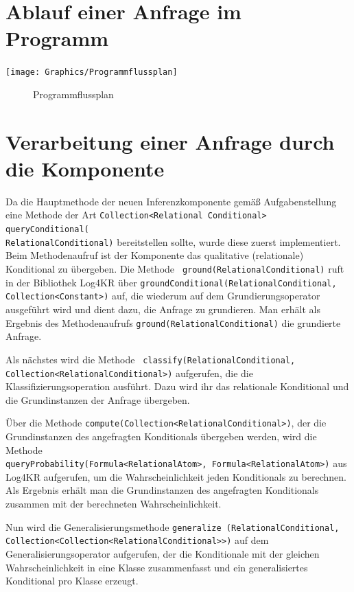 \documentclass[a4paper, 11pt]{book}
\begin{document}
{\section{Ablauf einer Anfrage im Programm}

\texttt{[image: Graphics/Programmflussplan]}
\begin{figure}[h]
		\caption{Programmflussplan}
\end{figure}


\section{Verarbeitung einer Anfrage durch die Komponente}
Da die Hauptmethode der neuen Inferenzkomponente gemäß Aufgabenstellung eine Methode der Art \texttt{Collection<Relational Conditional> queryConditional(\\RelationalConditional)} bereitstellen sollte, wurde diese zuerst  implementiert. Beim Methodenaufruf ist der Komponente das qualitative (relationale) Konditional zu übergeben.
Die Methode \texttt{ ground(RelationalConditional)} ruft in der Bibliothek Log4KR über \texttt{groundConditional(RelationalConditional, Collection<Constant>)} auf, die wiederum auf dem Grundierungsoperator ausgeführt wird und dient dazu, die Anfrage zu grundieren. Man erhält als Ergebnis des Methodenaufrufs \texttt{ground(RelationalConditional)} die grundierte Anfrage.

Als nächstes wird die Methode \texttt{ classify(RelationalConditional,\\ Collection<RelationalConditional>)} aufgerufen, die die Klassifizierungsoperation ausführt.
Dazu wird ihr das relationale Konditional und die Grundinstanzen der Anfrage übergeben.

Über die Methode \texttt{compute(Collection<RelationalConditional>)}, der die Grundinstanzen des angefragten Konditionals übergeben werden, wird die Methode\\ \texttt{queryProbability(Formula<RelationalAtom>, Formula<RelationalAtom>)} aus Log4KR aufgerufen, um die Wahrscheinlichkeit jeden Konditionals zu berechnen. Als Ergebnis erhält man die Grundinstanzen des angefragten Konditionals zusammen mit der berechneten Wahrscheinlichkeit.

Nun wird die Generalisierungsmethode \texttt{generalize (RelationalConditional, \\ Collection<Collection<RelationalConditional>>)} auf dem  Generalisierungsoperator aufgerufen, der die Konditionale mit der gleichen Wahrscheinlichkeit in eine Klasse zusammenfasst und ein generalisiertes Konditional pro Klasse erzeugt.

}
\end{document}

